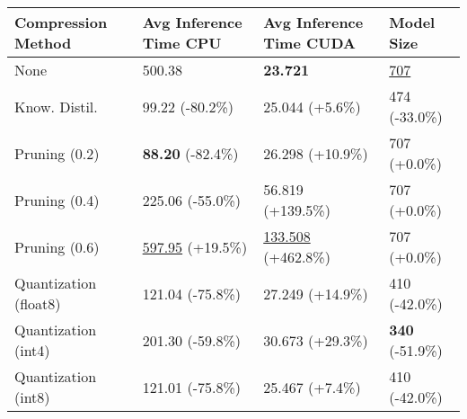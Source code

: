 \begin{tabular}{llll}
\toprule
\textbf{Compression Method} & \textbf{Avg Inference Time CPU} & \textbf{Avg Inference Time CUDA} & \textbf{Model Size} \\
\midrule
None & 500.38 & \textbf{23.721} & \underline{707} \\
Know. Distil. & 99.22 (-80.2\%) & 25.044 (+5.6\%) & 474 (-33.0\%) \\
Pruning (0.2) & \textbf{88.20} (-82.4\%) & 26.298 (+10.9\%) & 707 (+0.0\%) \\
Pruning (0.4) & 225.06 (-55.0\%) & 56.819 (+139.5\%) & 707 (+0.0\%) \\
Pruning (0.6) & \underline{597.95} (+19.5\%) & \underline{133.508} (+462.8\%) & 707 (+0.0\%) \\
Quantization (float8) & 121.04 (-75.8\%) & 27.249 (+14.9\%) & 410 (-42.0\%) \\
Quantization (int4) & 201.30 (-59.8\%) & 30.673 (+29.3\%) & \textbf{340} (-51.9\%) \\
Quantization (int8) & 121.01 (-75.8\%) & 25.467 (+7.4\%) & 410 (-42.0\%) \\
\bottomrule
\end{tabular}
